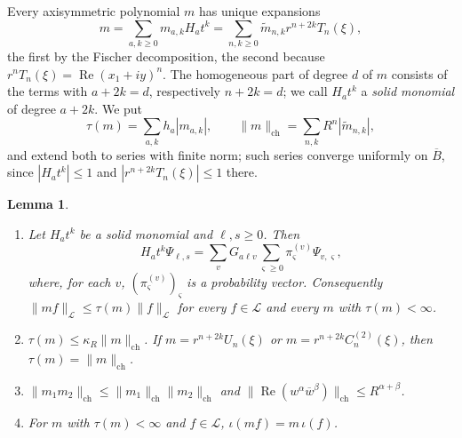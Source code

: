 \documentclass[11pt]{amsart}
\newtheorem{lemma}[theorem]{Lemma}
\theoremstyle{definition}
\theoremstyle{remark}
\numberwithin{equation}{section}
\newcommand{\bw}{\overline{w}}
\DeclareMathOperator{\re}{Re}
\newcommand{\nrm}[1]{\lVert #1\rVert}
\begin{document}
Every axisymmetric polynomial $m$ has unique expansions
\[
m=\sum_{a,k\geq0}m_{a,k}H_at^k=\sum_{n,k\geq0}\tilde m_{n,k}r^{n+2k}T_n(\xi),
\]
the first by the Fischer decomposition, the second because $r^nT_n(\xi)=\re(x_1+iy)^n$. The homogeneous part of degree $d$ of $m$ consists of the terms with $a+2k=d$, respectively $n+2k=d$; we call $H_at^k$ a \emph{solid monomial} of degree $a+2k$. We put
\[
\tau(m)=\sum_{a,k}h_a|m_{a,k}|,\qquad \nrm m_{\mathrm{ch}}=\sum_{n,k}R^n|\tilde m_{n,k}|,
\]
and extend both to series with finite norm; such series converge uniformly on $\overline B$, since $|H_at^k|\leq1$ and $|r^{n+2k}T_n(\xi)|\leq1$ there.

\begin{lemma}\label{r3:lem-mult}
\begin{enumerate}[label=\textup{(\alph*)}]
\item Let $H_at^k$ be a solid monomial and $\ell,s\geq0$. Then
\begin{equation}\label{r3:eq-monomial}
H_at^k\Psi_{\ell,s}=\sum_vG_{a\ell v}\sum_{\varsigma\geq0}\pi^{(v)}_\varsigma\Psi_{v,\varsigma},
\end{equation}
where, for each $v$, $(\pi^{(v)}_\varsigma)_\varsigma$ is a probability vector. Consequently $\nrm{mf}_{\mathcal L}\leq\tau(m)\nrm f_{\mathcal L}$ for every $f\in\mathcal L$ and every $m$ with $\tau(m)<\infty$.
\item $\tau(m)\leq\kappa_R\nrm m_{\mathrm{ch}}$. If $m=r^{n+2k}U_n(\xi)$ or $m=r^{n+2k}C^{(2)}_n(\xi)$, then $\tau(m)=\nrm m_{\mathrm{ch}}$.
\item $\nrm{m_1m_2}_{\mathrm{ch}}\leq\nrm{m_1}_{\mathrm{ch}}\nrm{m_2}_{\mathrm{ch}}$ and $\nrm{\re(w^\alpha\bw^\beta)}_{\mathrm{ch}}\leq R^{\alpha+\beta}$.
\item For $m$ with $\tau(m)<\infty$ and $f\in\mathcal L$, $\iota(mf)=m\,\iota(f)$.
\end{enumerate}
\end{lemma}
\end{document}
